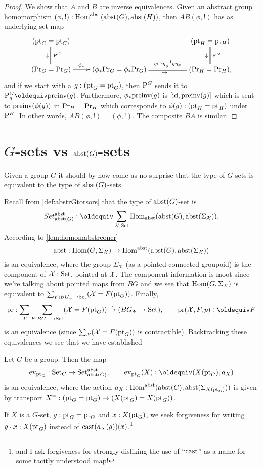 \begin{proof}
We show that $A$ and $B$ are inverse equivalences.  Given an abstract group homomorphism $(\phi,!):\mathrm{Hom}^{\mathrm{abst}}(\mathrm{abst}(G),\mathrm{abst}(H))$, then $AB(\phi,!)$ has as underlying set map
$$\xymatrix{(\pt_G=\pt_G)\ar@{=}[d]^{\pathsp{}^G}_\downarrow&&&
  (\pt_H=\pt_H)\ar@{=}[d]^{\pathsp{}^H}_\downarrow\\
  (\princ G=\princ G)\ar[r]^-{\phi_*}&
  (\phi_*\princ G=\phi_*\princ G)\ar@{=}[rr]^-{q\mapsto \eta_\phi^{-1}q\eta_\phi}_\to&&
  (\princ H=\princ H),
}$$
and if we start with a $g:({\mathord{\mathrm{pt}}}_G={\mathord{\mathrm{pt}}}_G)$, then $\mathrm{P}_{}^G$ sends it to $\pathsp g^G\oldequiv\preinv (g)$.  Furthermore, $\phi_*\mathrm{preinv} (g)$ is $[\mathord{\mathrm{id}},\mathrm{preinv} (g)]$ which is sent to $\mathrm{preinv} (\phi(g))$ in $\mathrm{Pr}_{{H}}=\mathrm{Pr}_{{H}}$ which corresponds to $\phi(g):({\mathord{\mathrm{pt}}}_H={\mathord{\mathrm{pt}}}_H)$ under $\mathrm{P}_{}^H$.  In other words, $AB(\phi,!)=(\phi,!)$.  The composite $BA$ is similar.
\end{proof}

\section{$G$-sets vs $\mathrm{abst}(G)$-sets}
\label{sec:Gsetsabstrconcr}

Given a group $G$ it should by now come as no surprise that the type of $G$-sets is equivalent to the type of $\mathrm{abst}(G)$-sets.

Recall from \cref{def:abstrGtorsors} that the type of $\mathrm{abst}(G)$-set is
$$Set_{\abstr(G)}^\abstr\defequi \sum_{\mathcal X:\Set}\Hom_\abstr({\abstr(G)},\abstr(\Sigma_{\mathcal X})).$$
According to \cref{lem:homomabstrconcr}
$$\mathrm{abst}:\mathrm{Hom}(G,\Sigma_{\mathcal X})\to\mathrm{Hom}^{\mathrm{abst}}(\mathrm{abst}(G),\mathrm{abst}(\Sigma_{\mathcal X}))$$
is an equivalence, where the group $\Sigma_{\mathcal X}$ (as a pointed connected groupoid) is the component of $\mathcal X:\mathord{\mathrm{Set}}$, pointed at $\mathcal X$.  The component information is moot since we're talking about pointed maps from $BG$ and we see that $\mathrm{Hom}(G,\Sigma_{\mathcal X})$ is equivalent to $\sum_{F:BG_\div\to\mathord{\mathrm{Set}}}(\mathcal X=F({\mathord{\mathrm{pt}}}_G))$.  Finally, 
$$\mathrm{pr}:\sum_{\mathcal X}\sum_{F:BG_\div\to\Set}(\mathcal X=F(\pt_G))\we 
(BG_\div\to\Set),\qquad \mathrm{pr}(\mathcal X,F,p)\defequi F
$$
is an equivalence (since $\sum_{\mathcal X}(\mathcal X=F({\mathord{\mathrm{pt}}}_G))$ is contractible).  
Backtracking these equivalences we see that we have established
\begin{lemma}
  \label{lem:actionsconcreteandabstract}
  Let $G$ be a group.  Then the map
  $$\ev_{\pt_G}:\Set_G\to\Set^\abstr_{\abstr(G)},\qquad \ev_{\pt_G}(X)\defequi(X(\pt_G),a_X)
$$
is an equivalence, where the action $a_X:\mathrm{Hom}^{\mathrm{abst}}(\mathrm{abst}(G), \mathrm{abst}(\Sigma_{X({\mathord{\mathrm{pt}}}_G)}))$ is given by transport $X^=:({\mathord{\mathrm{pt}}}_G={\mathord{\mathrm{pt}}}_G)\to (X({\mathord{\mathrm{pt}}}_G)=X({\mathord{\mathrm{pt}}}_G))$.
\end{lemma}
If $X$ is a $G$-set, $g:{\mathord{\mathrm{pt}}}_G={\mathord{\mathrm{pt}}}_G$ and $x:X({\mathord{\mathrm{pt}}}_G)$, we seek forgiveness for writing $g\cdot x:X({\mathord{\mathrm{pt}}}_G)$ instead of $\mathrm{cast}(a_X(g))(x)$.\footnote{and I ask forgiveness for strongly disliking the use of ``$\mathrm{cast}$'' as a name for some tacitly understood map!}

